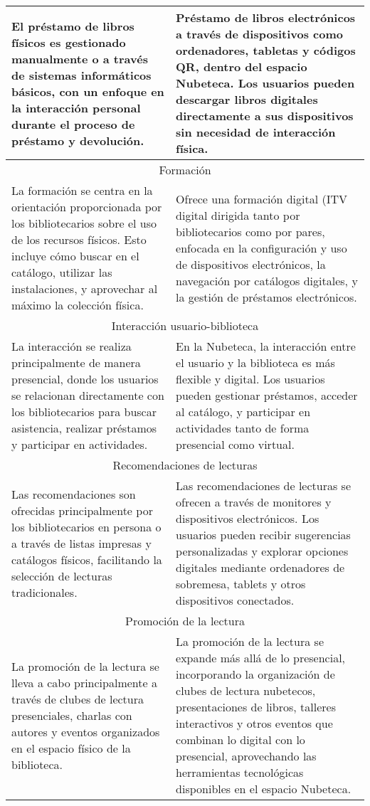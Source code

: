 \documentclass[spanish]{textolivre}
\begin{document}
\begin{table}[htbp]
\begin{threeparttable}
\begin{tabular}{p{} p{}}
\midrule
El préstamo de libros físicos es gestionado manualmente o a través de sistemas informáticos básicos, con un enfoque en la interacción personal durante el proceso de préstamo y devolución. & Préstamo de libros electrónicos a través de dispositivos como ordenadores, tabletas y códigos QR, dentro del espacio Nubeteca.
Los usuarios pueden descargar libros digitales directamente a sus dispositivos sin necesidad de interacción física. \\
\midrule
\multicolumn{2}{c}{Formación} \\
\midrule
La formación se centra en la orientación proporcionada por los bibliotecarios sobre el uso de los recursos físicos. Esto incluye cómo buscar en el catálogo, utilizar las instalaciones, y aprovechar al máximo la colección física. & Ofrece una formación digital (ITV digital dirigida tanto por bibliotecarios como por pares, enfocada en la configuración y uso de dispositivos electrónicos, la navegación por catálogos digitales, y la gestión de préstamos electrónicos. \\
\midrule
\multicolumn{2}{c}{Interacción usuario-biblioteca} \\
\midrule
La interacción se realiza principalmente de manera presencial, donde los usuarios se relacionan directamente con los bibliotecarios para buscar asistencia, realizar préstamos y participar en actividades. & En la Nubeteca, la interacción entre el usuario y la biblioteca es más flexible y digital. Los usuarios pueden gestionar préstamos, acceder al catálogo, y participar en actividades tanto de forma presencial como virtual. \\
\midrule
\multicolumn{2}{c}{Recomendaciones de lecturas} \\
\midrule
Las recomendaciones son ofrecidas principalmente por los bibliotecarios en persona o a través de listas impresas y catálogos físicos, facilitando la selección de lecturas tradicionales. & Las recomendaciones de lecturas se ofrecen a través de monitores y dispositivos electrónicos. Los usuarios pueden recibir sugerencias personalizadas y explorar opciones digitales mediante ordenadores de sobremesa, tablets y otros dispositivos conectados. \\
\midrule
\multicolumn{2}{c}{Promoción de la lectura} \\
\midrule
La promoción de la lectura se lleva a cabo principalmente a través de clubes de lectura presenciales, charlas con autores y eventos organizados en el espacio físico de la biblioteca. & La promoción de la lectura se expande más allá de lo presencial, incorporando la organización de clubes de lectura nubetecos, presentaciones de libros, talleres interactivos  y otros eventos que combinan lo digital con lo presencial, aprovechando las herramientas tecnológicas disponibles en el espacio Nubeteca. \\
\bottomrule
\end{tabular}
\end{threeparttable}
\end{table}
\end{document}
